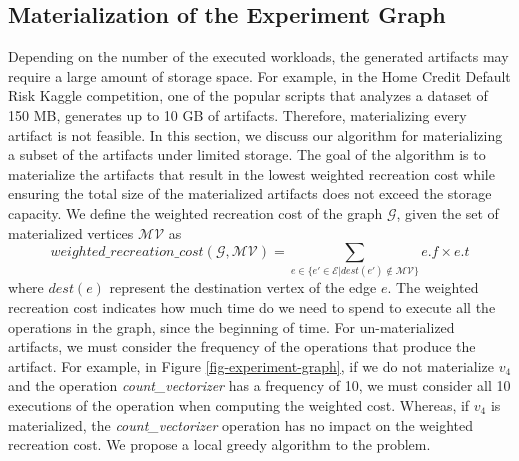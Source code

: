 \subsection{Materialization of the Experiment Graph}\label{subsec-materialization}
Depending on the number of the executed workloads, the generated artifacts may require a large amount of storage space.
For example, in the Home Credit Default Risk Kaggle competition, one of the popular scripts that analyzes a dataset of 150 MB, generates up to 10 GB of artifacts.
Therefore, materializing every artifact is not feasible.
In this section, we discuss our algorithm for materializing a subset of the artifacts under limited storage.
The goal of the algorithm is to materialize the artifacts that result in the lowest weighted recreation cost while ensuring the total size of the materialized artifacts does not exceed the storage capacity.
We define the weighted recreation cost of the graph $\mathcal{G}$, given the set of materialized vertices $\mathcal{MV}$ as 
\[
weighted\_recreation\_cost(\mathcal{G}, \mathcal{MV}) =  \sum\limits_{e \in \{e' \in \mathcal{E}  \lvert dest(e') \notin \mathcal{MV}\}}  e.f \times e.t
\]
where $dest(e)$ represent the destination vertex of the edge $e$.
The weighted recreation cost indicates how much time do we need to spend to execute all the operations in the graph, since the beginning of time.
For un-materialized artifacts, we must consider the frequency of the operations that produce the artifact.
For example, in Figure \ref{fig-experiment-graph}, if we do not materialize $v_4$ and the operation \textit{count\_vectorizer} has a frequency of 10, we must consider all 10 executions of the operation when computing the weighted cost.
Whereas, if $v_4$ is materialized, the \textit{count\_vectorizer} operation has no impact on the weighted recreation cost.
We propose a local greedy algorithm to the problem.

